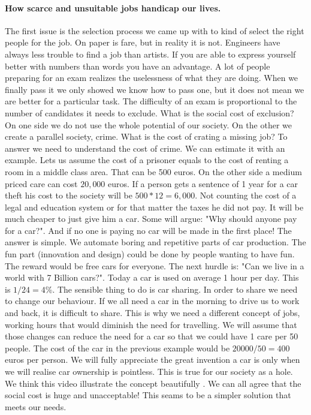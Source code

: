 \documentclass{article}
\begin{document}
\paragraph{How scarce and unsuitable jobs handicap our lives.}
The first issue is the selection process we came up with to kind of select the right people for the job.
On paper is fare, but in reality it is not.
Engineers have always less trouble to find a job than artists.
If you are able to express yourself better with numbers than words you have an advantage.
A lot of people preparing for an exam realizes the uselessness of what they are doing.
When we finally pass it we only showed we know how to pass one, but it does not mean we are better for a particular task.
The difficulty of an exam is proportional to the number of candidates it needs to exclude.
What is the social cost of exclusion?
On one side we do not use the whole potential of our society.
On the other we create a parallel society, crime.
What is the cost of crating a missing job?
To answer we need to understand the cost of crime.
We can estimate it with an example.
Lets us assume the cost of a prisoner equals to the cost of renting a room in a middle class area.
That can be 500 euros.
On the other side a medium priced care can cost $20,000$ euros.
If a person gets a sentence of 1 year for a car theft his cost to the society will be $500*12=6,000$.
Not counting the cost of a legal and education system or for that matter the taxes he did not pay.
It will be much cheaper to just give him a car.
Some will argue: "Why should anyone pay for a car?".
And if no one is paying no car will be made in the first place!
The answer is simple.
We automate boring and repetitive parts of car production.
The fun part (innovation and design) could be done by people wanting to have fun.
The reward would be free cars for everyone.
The next hurdle is: "Can we live in a world with 7 Billion cars?".
Today a car is used on average 1 hour per day.
This is $1/24=4$\%.
The sensible thing to do is car sharing.
In order to share we need to change our behaviour.
If we all need a car in the morning to drive us to work and back, it is difficult to share.
This is why we need a different concept of jobs, working hours that would diminish the need for travelling.
We will assume that those changes can reduce the need for a car so that we could have 1 care per 50 people.
The cost of the car in the previous example would be $20000/50=400$ euros per person.
We will fully appreciate the great invention a car is only when we will realise car ownership is pointless.
This is true for our society as a hole.
We think this video illustrate the concept beautifully \cite{c_c}.
We can all agree that the social cost is huge and unacceptable!
This seams to be a simpler solution that meets our needs.
\end{document}
